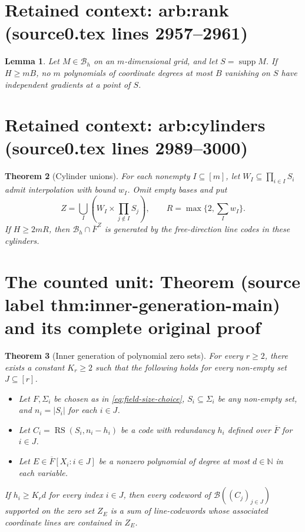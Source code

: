 \documentclass[10pt,a4paper]{amsart}
\newcommand{\RS}{\operatorname{RS}}
\newcommand{\cB}{\mathcal B}
\newcommand{\supp}{\operatorname{supp}}
\theoremstyle{plain}
\newtheorem{theorem}{Theorem}[section]
\newtheorem{lemma}[theorem]{Lemma}
\theoremstyle{definition}
\theoremstyle{remark}
\begin{document}
\section*{Retained context: arb:rank (source0.tex lines 2957--2961)}

\begin{lemma}\label{arb:rank}\label{lem:rank}
Let $M\in\cB_h$ on an $m$-dimensional grid, and let $S=\supp M$.
If $H\ge mB$, no $m$ polynomials of coordinate degrees at most $B$
vanishing on $S$ have independent gradients at a point of $S$.
\end{lemma}


\section*{Retained context: arb:cylinders (source0.tex lines 2989--3000)}

\begin{theorem}[Cylinder unions]
\label{arb:cylinders}\label{thm:cylinders}
For each nonempty $I\subseteq[m]$, let
$W_I\subseteq\prod_{i\in I}S_i$ admit interpolation with bound $w_I$.
Omit empty bases and put
\[
 Z=\bigcup_I\left(W_I\times\prod_{j\notin I}S_j\right),
 \qquad R=\max\{2,\sum_Iw_I\}.
\]
If $H\ge2mR$, then $\cB_h\cap\overline F^Z$ is generated by the
free-direction line codes in these cylinders.
\end{theorem}


\section{The counted unit: Theorem (source label thm:inner-generation-main) and its complete original proof}

\begin{theorem}[Inner generation of polynomial zero sets]
\label{thm:inner-generation-main}
For every $r \ge 2$, there exists a constant $K_r \ge 2$
such that the following holds for every non-empty set $J \subseteq [r]$.
\begin{itemize}[itemsep=0pt]
    \item Let $F, \Sigma_i$ be chosen as in \eqref{eq:field-size-choice}, $S_i \subseteq \Sigma_i$ be any non-empty set, and $n_i = |S_i|$ for each $i \in J$.
    \item Let $C_i = \RS(S_i,n_i-h_i)$ be a code with redundancy $h_i$ defined over $\overline{F}$ for $i \in J$.
    \item Let $E \in \overline{F}[X_i : i\in J]$ be a nonzero polynomial of degree at most $d \in \mathbb N$ in each variable.
\end{itemize}
If $h_i \ge K_r d$ for every index $i\in J$, then every codeword of
$\mathcal{B}((C_j)_{j\in J})$ supported on the zero set $Z_E$
is a sum of line-codewords whose associated
coordinate lines are contained in $Z_E$.
\end{theorem}
\end{document}
